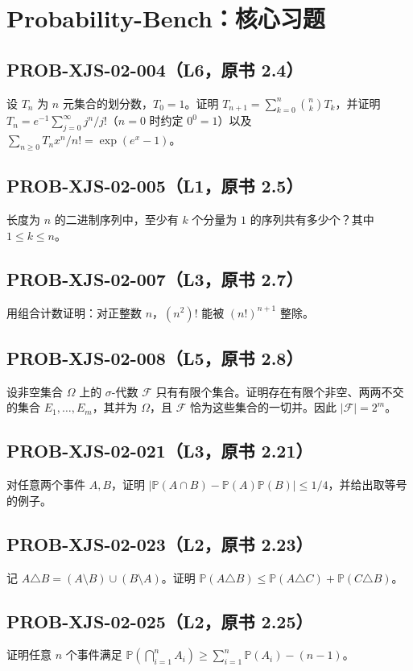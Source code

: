 \documentclass[UTF8]{ctexart}
\begin{document}
\section*{Probability-Bench：核心习题}
\subsection*{PROB-XJS-02-004（L6，原书 2.4）}
设 $T_n$ 为 $n$ 元集合的划分数，$T_0=1$。证明 $T_{n+1}=\sum_{k=0}^n\binom nkT_k$，并证明 $T_n=e^{-1}\sum_{j=0}^\infty j^n/j!$（$n=0$ 时约定 $0^0=1$）以及 $\sum_{n\ge0}T_nx^n/n!=\exp(e^x-1)$。

\subsection*{PROB-XJS-02-005（L1，原书 2.5）}
长度为 $n$ 的二进制序列中，至少有 $k$ 个分量为 $1$ 的序列共有多少个？其中 $1\le k\le n$。

\subsection*{PROB-XJS-02-007（L3，原书 2.7）}
用组合计数证明：对正整数 $n$，$(n^2)!$ 能被 $(n!)^{n+1}$ 整除。

\subsection*{PROB-XJS-02-008（L5，原书 2.8）}
设非空集合 $\Omega$ 上的 $\sigma$-代数 $\mathcal F$ 只有有限个集合。证明存在有限个非空、两两不交的集合 $E_1,\ldots,E_m$，其并为 $\Omega$，且 $\mathcal F$ 恰为这些集合的一切并。因此 $|\mathcal F|=2^m$。

\subsection*{PROB-XJS-02-021（L3，原书 2.21）}
对任意两个事件 $A,B$，证明 $|\mathbb P(A\cap B)-\mathbb P(A)\mathbb P(B)|\le1/4$，并给出取等号的例子。

\subsection*{PROB-XJS-02-023（L2，原书 2.23）}
记 $A\triangle B=(A\setminus B)\cup(B\setminus A)$。证明 $\mathbb P(A\triangle B)\le\mathbb P(A\triangle C)+\mathbb P(C\triangle B)$。

\subsection*{PROB-XJS-02-025（L2，原书 2.25）}
证明任意 $n$ 个事件满足 $\mathbb P(\bigcap_{i=1}^n A_i)\ge\sum_{i=1}^n\mathbb P(A_i)-(n-1)$。
\end{document}
